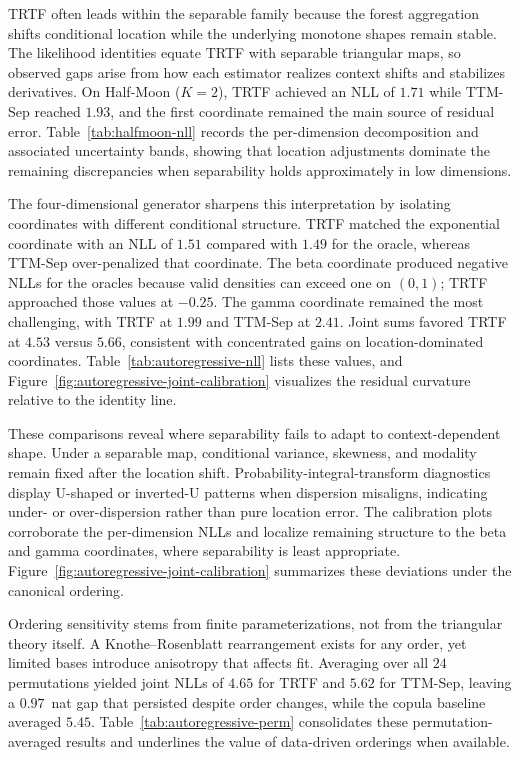 \documentclass[11pt,a4paper,twoside]{book}\usepackage[]{graphicx}\usepackage[]{xcolor}
\begin{document}
TRTF often leads within the separable family because the forest aggregation shifts conditional location while the underlying monotone shapes remain stable. The likelihood identities equate TRTF with separable triangular maps, so observed gaps arise from how each estimator realizes context shifts and stabilizes derivatives. On Half-Moon ($K=2$), TRTF achieved an NLL of $1.71$ while TTM-Sep reached $1.93$, and the first coordinate remained the main source of residual error. Table~\ref{tab:halfmoon-nll} records the per-dimension decomposition and associated uncertainty bands, showing that location adjustments dominate the remaining discrepancies when separability holds approximately in low dimensions.

The four-dimensional generator sharpens this interpretation by isolating coordinates with different conditional structure. TRTF matched the exponential coordinate with an NLL of $1.51$ compared with $1.49$ for the oracle, whereas TTM-Sep over-penalized that coordinate. The beta coordinate produced negative NLLs for the oracles because valid densities can exceed one on $(0,1)$; TRTF approached those values at $-0.25$. The gamma coordinate remained the most challenging, with TRTF at $1.99$ and TTM-Sep at $2.41$. Joint sums favored TRTF at $4.53$ versus $5.66$, consistent with concentrated gains on location-dominated coordinates. Table~\ref{tab:autoregressive-nll} lists these values, and Figure~\ref{fig:autoregressive-joint-calibration} visualizes the residual curvature relative to the identity line.

These comparisons reveal where separability fails to adapt to context-dependent shape. Under a separable map, conditional variance, skewness, and modality remain fixed after the location shift. Probability-integral-transform diagnostics display U-shaped or inverted-U patterns when dispersion misaligns, indicating under- or over-dispersion rather than pure location error. The calibration plots corroborate the per-dimension NLLs and localize remaining structure to the beta and gamma coordinates, where separability is least appropriate. Figure~\ref{fig:autoregressive-joint-calibration} summarizes these deviations under the canonical ordering.

Ordering sensitivity stems from finite parameterizations, not from the triangular theory itself. A Knothe--Rosenblatt rearrangement exists for any order, yet limited bases introduce anisotropy that affects fit. Averaging over all $24$ permutations yielded joint NLLs of $4.65$ for TRTF and $5.62$ for TTM-Sep, leaving a $0.97$~nat gap that persisted despite order changes, while the copula baseline averaged $5.45$. Table~\ref{tab:autoregressive-perm} consolidates these permutation-averaged results and underlines the value of data-driven orderings when available.
\end{document}

